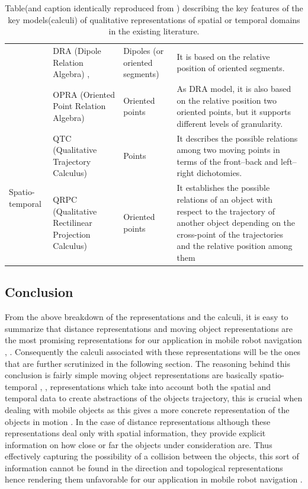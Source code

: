 \begin{table}[h!]
\begin{adjustwidth}{-2cm}{}
{\begin{tabular}{|p{3cm}|p{4cm}|p{3cm}|p{8cm}|}
						& DRA (Dipole Relation Algebra)  \cite{dylla2004empirical}, \cite{dylla2004exploiting} & Dipoles (or oriented segments) & It is based on the relative position of oriented segments. \\ \cline{2-4} 
						& OPRA (Oriented Point Relation Algebra)  \cite{dylla2006generalizing} & Oriented points & As DRA model, it is also based on the relative position two oriented points, but it supports different levels of granularity. \\ \hline
						\multirow{2}{*}{Spatio-temporal} & QTC (Qualitative Trajectory Calculus)  \cite{van2005representing} & Points & It describes the possible relations among two moving points in terms of the front–back and left–right dichotomies. \\ \cline{2-4} 
						& QRPC (Qualitative Rectilinear Projection Calculus)  \cite{glez2013qrpc} & Oriented points & It establishes the possible relations of an object with respect to the trajectory of another object depending on the cross-point of the trajectories and the relative position among them \\ \hline
				\end{tabular}}
			\caption{Table(and caption identically reproduced from \cite{glez2013qrpc}) describing the key features of the key models(calculi) of qualitative representations of spatial or temporal domains in the existing literature.}
			\end{adjustwidth}
		\end{table}
	
			\newpage
	
		\subsection{Conclusion}From the above breakdown of the representations and the calculi, it is easy to summarize that distance representations and moving object representations are the most promising representations for our application in mobile robot navigation \cite{chen2015survey}, \cite{cohn1997qualitative}. Consequently the calculi associated with these representations will be the ones that are further scrutinized in the following section. The reasoning behind this conclusion is fairly simple moving object representations are basically spatio-temporal \cite{cohn2001qualitative}, \cite{cohn2008qualitative}, \cite{Yan2012QualitativeRA} representations which take into account both the spatial and temporal data to create abstractions of the objects trajectory, this is crucial when dealing with mobile objects as this gives a more concrete representation of the objects in motion \cite{glez2013qrpc}. In the case of distance representations although these representations deal only with spatial information, they provide explicit information on how close or far the objects under consideration are. Thus effectively capturing the possibility of a collision between the objects, this sort of information cannot be found in the direction and topological representations hence rendering them unfavorable for our application in mobile robot navigation  .
	
